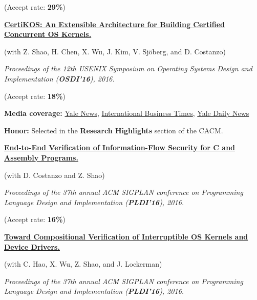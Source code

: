 \documentclass[11pt]{article}
\begin{document}
(Accept rate: \textbf{29\%})

\vspace{.2in}

\href{https://www.usenix.org/conference/osdi16/technical-sessions/presentation/gu}{\textbf{CertiKOS: An Extensible Architecture for Building Certified Concurrent OS Kernels.}}

(with Z. Shao, H. Chen, X. Wu, J. Kim, V. Sj\"{o}berg, and D. Costanzo) 

\emph{Proceedings of the 12th USENIX Symposium on Operating Systems Design and Implementation (\textbf{OSDI'16}), 2016.}

(Accept rate: \textbf{18\%})

\textbf{Media coverage:} \href{http://news.yale.edu/2016/11/14/certikos-breakthrough-toward-hacker-resistant-operating-systems}{Yale News},
\href{http://www.ibtimes.co.uk/certikos-yale-develops-worlds-first-hacker-resistant-operating-system-1591712}{International Business Times}, \href{http://yaledailynews.com/blog/2016/11/18/yale-computer-scientists-unveil-new-os/}
{Yale Daily News}

\textbf{Honor:} Selected in the \textbf{Research Highlights} section of the CACM.

\vspace{.2in}

\href{http://conf.researchr.org/event/pldi-2016/pldi-2016-papers-end-to-end-verification-of-information-flow-security-for-c-and-assembly-programs-}{\textbf{End-to-End Verification of Information-Flow Security for C and Assembly Programs.}}

(with D. Costanzo and Z. Shao)

\emph{Proceedings of the 37th annual ACM SIGPLAN conference on Programming Language Design and Implementation (\textbf{PLDI'16}), 2016.}

(Accept rate: \textbf{16\%})

\vspace{.2in}


\href{http://conf.researchr.org/event/pldi-2016/pldi-2016-papers-toward-compositional-verification-of-interruptible-os-kernels-and-device-drivers}{\textbf{Toward Compositional Verification of Interruptible OS Kernels and Device Drivers.}}

(with C. Hao, X. Wu, Z. Shao, and J. Lockerman)

\emph{Proceedings of the 37th annual ACM SIGPLAN conference on Programming Language Design and Implementation (\textbf{PLDI'16}), 2016.}
\end{document}
